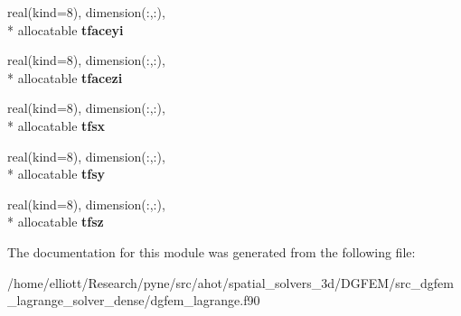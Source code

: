 \begin{DoxyCompactItemize}
\item 
\hypertarget{classdgfem__lagrange_ad9aea6402d5e36164ae41e9526c17825}{real(kind=8), dimension(\-:,\-:), \\*
allocatable {\bfseries tfaceyi}}\label{classdgfem__lagrange_ad9aea6402d5e36164ae41e9526c17825}

\item 
\hypertarget{classdgfem__lagrange_a2aff66b06931f934592c47c07a67f78d}{real(kind=8), dimension(\-:,\-:), \\*
allocatable {\bfseries tfacezi}}\label{classdgfem__lagrange_a2aff66b06931f934592c47c07a67f78d}

\item 
\hypertarget{classdgfem__lagrange_afd3cf4c173e4b04e2038b2e7cb6e9f23}{real(kind=8), dimension(\-:,\-:), \\*
allocatable {\bfseries tfsx}}\label{classdgfem__lagrange_afd3cf4c173e4b04e2038b2e7cb6e9f23}

\item 
\hypertarget{classdgfem__lagrange_a3227176b19511ae90db3ee5b93cd1da2}{real(kind=8), dimension(\-:,\-:), \\*
allocatable {\bfseries tfsy}}\label{classdgfem__lagrange_a3227176b19511ae90db3ee5b93cd1da2}

\item 
\hypertarget{classdgfem__lagrange_ae4bc228f094f616277477f9a733b05ca}{real(kind=8), dimension(\-:,\-:), \\*
allocatable {\bfseries tfsz}}\label{classdgfem__lagrange_ae4bc228f094f616277477f9a733b05ca}

\end{DoxyCompactItemize}


The documentation for this module was generated from the following file\-:\begin{DoxyCompactItemize}
\item 
/home/elliott/\-Research/pyne/src/ahot/spatial\-\_\-solvers\-\_\-3d/\-D\-G\-F\-E\-M/src\-\_\-dgfem\-\_\-lagrange\-\_\-solver\-\_\-dense/dgfem\-\_\-lagrange.\-f90\end{DoxyCompactItemize}
